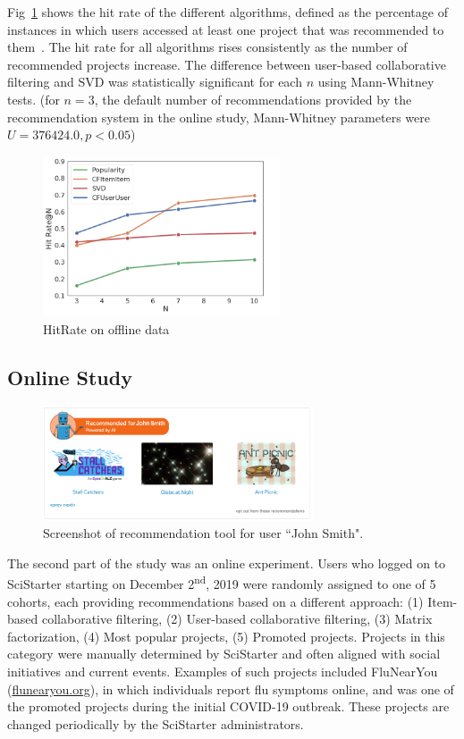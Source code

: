 \documentclass[letterpaper]{article} %
\begin{document}
 
Fig~\ref{fig:offlinehr} shows the hit rate of the different algorithms, defined as the percentage of instances in which users accessed at least one project that was recommended to them~\cite{wang2015recommendation}.  
The hit rate for all algorithms rises consistently as the number of recommended projects increase.
The difference between user-based collaborative filtering and SVD was statistically significant for each $n$  using Mann-Whitney tests.
(for $n=3$, the default number of recommendations provided by the recommendation system in the online study, Mann-Whitney parameters were $U=376424.0, p < 0.05$)
 
\begin{figure}[t]
\centering
\includegraphics[width=7cm]{Figs/HitRate_N.png}
\caption{HitRate on offline data}
\label{fig:offlinehr}
\end{figure}
 \subsection{Online Study}
 
\begin{figure}[t]
\centering
\includegraphics[width=8cm]{Figs/RecTool.png}
\caption{Screenshot of recommendation tool for user ``John Smith".}
\label{fig:fstat}
\end{figure}


 
The second part of the study  was an online experiment.   Users who logged on to SciStarter   starting on 
 December 2\textsuperscript{nd}, 2019 were randomly assigned to one of  5 cohorts, each providing recommendations based on a different approach: 
(1) Item-based collaborative filtering, (2) User-based collaborative filtering, (3)  Matrix factorization, (4) Most popular projects, (5) Promoted projects.   Projects in this category were manually determined by 
SciStarter and often aligned with social initiatives and  current events.   Examples of such projects
 included FluNearYou (\url{flunearyou.org}), in which individuals report flu symptoms online,  and was one of the promoted 
projects during the initial COVID-19 outbreak.  
These projects are changed periodically  by the SciStarter administrators.  
\end{document}
